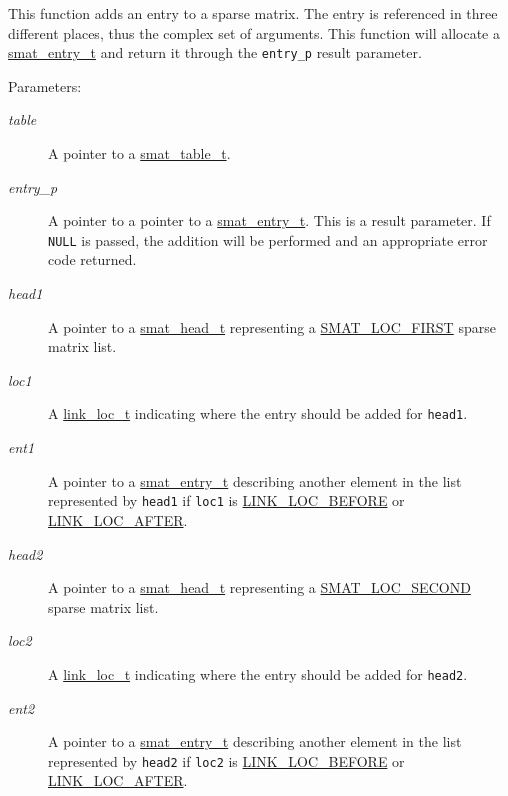 This function adds an entry to a sparse matrix. The entry is referenced in three different places, thus the complex set of arguments. This function will allocate a \hyperlink{group__dbprim__smat_a2}{smat\_\-entry\_\-t} and return it through the {\tt entry\_\-p} result parameter.\begin{Desc}
\item[Parameters: ]\par
\begin{description}
\item[{\em 
table}]A pointer to a \hyperlink{group__dbprim__smat_a0}{smat\_\-table\_\-t}. \item[{\em 
entry\_\-p}]A pointer to a pointer to a \hyperlink{group__dbprim__smat_a2}{smat\_\-entry\_\-t}. This is a result parameter. If {\tt NULL} is passed, the addition will be performed and an appropriate error code returned. \item[{\em 
head1}]A pointer to a \hyperlink{group__dbprim__smat_a1}{smat\_\-head\_\-t} representing a \hyperlink{group__dbprim__smat_a48a136}{SMAT\_\-LOC\_\-FIRST} sparse matrix list. \item[{\em 
loc1}]A \hyperlink{group__dbprim__link_a4}{link\_\-loc\_\-t} indicating where the entry should be added for {\tt head1}. \item[{\em 
ent1}]A pointer to a \hyperlink{group__dbprim__smat_a2}{smat\_\-entry\_\-t} describing another element in the list represented by {\tt head1} if {\tt loc1} is \hyperlink{group__dbprim__link_a26a134}{LINK\_\-LOC\_\-BEFORE} or \hyperlink{group__dbprim__link_a26a135}{LINK\_\-LOC\_\-AFTER}. \item[{\em 
head2}]A pointer to a \hyperlink{group__dbprim__smat_a1}{smat\_\-head\_\-t} representing a \hyperlink{group__dbprim__smat_a48a137}{SMAT\_\-LOC\_\-SECOND} sparse matrix list. \item[{\em 
loc2}]A \hyperlink{group__dbprim__link_a4}{link\_\-loc\_\-t} indicating where the entry should be added for {\tt head2}. \item[{\em 
ent2}]A pointer to a \hyperlink{group__dbprim__smat_a2}{smat\_\-entry\_\-t} describing another element in the list represented by {\tt head2} if {\tt loc2} is \hyperlink{group__dbprim__link_a26a134}{LINK\_\-LOC\_\-BEFORE} or \hyperlink{group__dbprim__link_a26a135}{LINK\_\-LOC\_\-AFTER}.\end{description}
\end{Desc}
